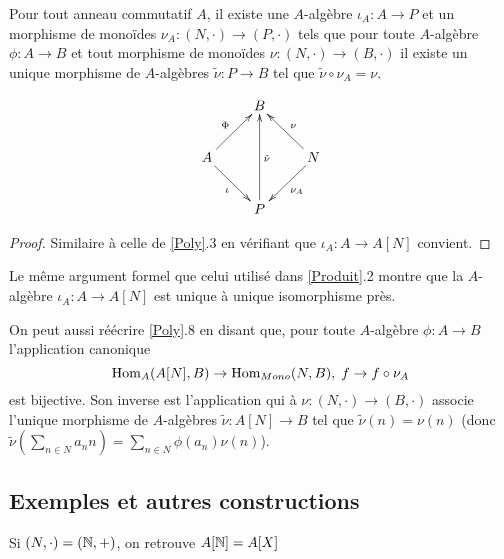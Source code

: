 \begin{lemme}
    Pour tout anneau commutatif $A$, il existe une $A$-algèbre $\iota_A:
    A\rightarrow P$ et un  morphisme de monoïdes $\nu_A:(N,\cdot)\rightarrow (P
    ,\cdot)$ tels que pour toute $A$-algèbre   $\phi: A\rightarrow B$ et tout
    morphisme de monoïdes $\nu:(N,\cdot)\rightarrow (B  ,\cdot)$  il existe un
    unique  morphisme de $A$-algèbres $\tilde{\nu}:P\rightarrow B$  tel que $
    \tilde{\nu}\circ \nu_A=\nu$.
\end{lemme}

    \[\xymatrix{ & B \\ A \ar[ru]^\Phi \ar[rd]_\iota & & N \ar[lu]_\nu
    \ar[ld]^{\nu_A} \\ & P \ar[uu]_{\tilde{\nu} } }\]

\begin{proof}
    Similaire à celle de \ref{Poly}.3 en vérifiant que $\iota_A:A\rightarrow
    A[N]$ convient.
\end{proof}


Le même argument  formel que celui utilisé dans \ref{Produit}.2 montre que la
$A$-algèbre $\iota_A: A\rightarrow A[N]$ est unique à unique isomorphisme
près.\\

\begin{remarque}
    On peut aussi réécrire \ref{Poly}.8 en disant que, pour toute $A$-algèbre
    $\phi:A\rightarrow B$  l'application canonique
    $$\operatorname{Hom}_A(A[N],B)\rightarrow\operatorname{Hom}_{Mono}(N,B),\; f\rightarrow f\circ\nu_A$$
    est bijective. Son inverse est l'application qui à
    $\nu:(N,\cdot)\rightarrow (B,\cdot) $ associe l'unique morphisme de
    $A$-algèbres $ \tilde{\nu}:A[N]\rightarrow B$ tel que $
    \tilde{\nu}(n)=\nu(n)$ (donc $\tilde{\nu}(\sum_{n\in N}a_nn)=\sum_{n\in
    N}\phi(a_n)\nu(n)$).
\end{remarque}

\subsection{Exemples et autres constructions}

\begin{remarque}
    Si $(N,\cdot)=(\mathbb{N},+)$, on retrouve $A[\mathbb{N}]=A[X]$
\end{remarque}

